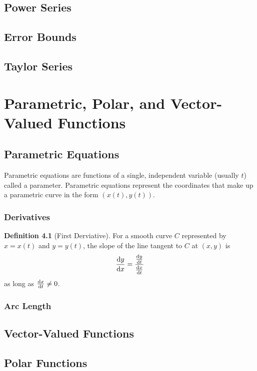 \documentclass[letterpaper]{report}
\theoremstyle{definition}
\newtheorem{definition}{Definition}
\begin{document}
\section{Power Series}

\section{Error Bounds}

\section{Taylor Series}

\chapter{Parametric, Polar, and Vector-Valued Functions}

\section{Parametric Equations}
Parametric equations are functions of a single, independent variable 
(usually $t$) called a parameter.
Parametric equations represent the coordinates that make up a parametric curve
in the form $(x(t), y(t))$.

\subsection{Derivatives}
\begin{definition}[First Derviative]
    For a smooth curve $C$ represented by $x = x(t)$ and $y = y(t)$,
    the slope of the line tangent to $C$ at $(x,y)$ is
\[ \dv{y}{x} = \frac{\dv{y}{t}}{\dv{x}{t}} \]
as long as $\dv{x}{t} \neq 0$. 
\end{definition}

\subsection{Arc Length}

\section{Vector-Valued Functions}

\section{Polar Functions}
\end{document}
